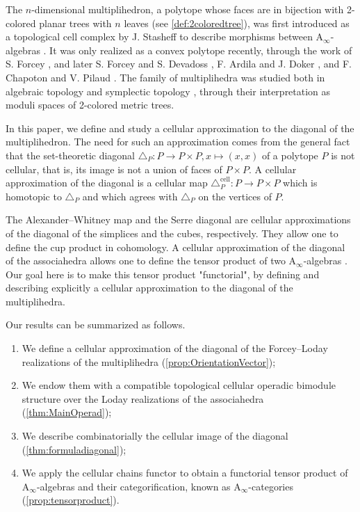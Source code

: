 \documentclass[twoside, 12pt]{amsart}
\theoremstyle{remark}
\begin{document}
\medskip

The $n$-dimensional multiplihedron, a polytope whose faces are in bijection with 2-colored planar trees with $n$ leaves (see \cref{def:2coloredtree}), was first introduced as a topological cell complex by J. Stasheff to describe morphisms between $\mathrm{A}_\infty$-algebras \cite{Stasheff70}.
It was only realized as a convex polytope recently, through the work of S. Forcey \cite{Forcey08}, and later S. Forcey and S. Devadoss \cite{DevadossForcey08}, F. Ardila and J. Doker \cite{AD13}, and F. Chapoton and V. Pilaud \cite{CP22}.
The family of multiplihedra was studied both in algebraic topology \cite{BoardmanVogt73} and symplectic topology \cite{MauWoodward10,Mazuir21}, through their interpretation as moduli spaces of 2-colored metric trees. 

\medskip

In this paper, we define and study a cellular approximation to the diagonal of the multiplihedron. 
The need for such an approximation comes from the general fact that the set-theoretic diagonal $\triangle_P:P\to P\times P, x\mapsto (x,x)$ of a polytope $P$ is not cellular, that is, its image is not a union of faces of $P\times P$. 
A cellular approximation of the diagonal is a cellular map $\triangle_P^{\textrm{cell}} : P \to P\times P$ which is homotopic to $\triangle_P$ and which agrees with $\triangle_P$ on the vertices of $P$.

\medskip

The Alexander--Whitney map \cite{EilenbergMacLane53} and the Serre diagonal \cite{Serre51} are cellular approximations of the diagonal of the simplices and the cubes, respectively. 
They allow one to define the cup product in cohomology.
A cellular approximation of the diagonal of the associahedra allows one to define the tensor product of two $\mathrm{A}_\infty$-algebras \cite{SaneblidzeUmble04,MarklShnider06,MTTV19}. 
Our goal here is to make this tensor product "functorial", by defining and describing explicitly a cellular approximation to the diagonal of the multiplihedra.

\medskip

Our results can be summarized as follows.
\begin{enumerate}
  \item We define a cellular approximation of the diagonal of the Forcey--Loday realizations of the multiplihedra (\cref{prop:OrientationVector});
  \item We endow them with a compatible topological cellular operadic bimodule structure over the Loday realizations of the associahedra (\cref{thm:MainOperad});
  \item We describe combinatorially the cellular image of the diagonal (\cref{thm:formuladiagonal});
  \item We apply the cellular chains functor to obtain a functorial tensor product of $\mathrm{A}_\infty$-algebras and their categorification, known as $\mathrm{A}_\infty$-categories (\cref{prop:tensorproduct}).
\end{enumerate}
\end{document}
